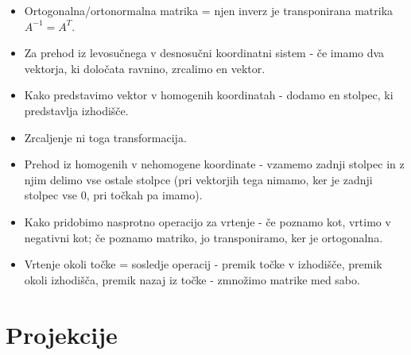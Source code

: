 \documentclass{article}
\begin{document}
\begin{itemize}
    \item Ortogonalna/ortonormalna matrika = njen inverz je transponirana matrika $A^{-1} = A^T$.
    \item Za prehod iz levosučnega v desnosučni koordinatni sistem - če imamo dva vektorja, ki določata ravnino, zrcalimo en vektor. 
    \item Kako predstavimo vektor v homogenih koordinatah - dodamo en stolpec, ki predstavlja izhodišče.
    \item Zrcaljenje ni toga transformacija.
    \item Prehod iz homogenih v nehomogene koordinate - vzamemo zadnji stolpec in z njim delimo vse ostale stolpce (pri vektorjih tega nimamo, ker je zadnji stolpec vse 0, pri točkah pa imamo).
    \item Kako pridobimo nasprotno operacijo za vrtenje - če poznamo kot, vrtimo v negativni kot; če poznamo matriko, jo transponiramo, ker je ortogonalna.
    \item Vrtenje okoli točke = sosledje operacij - premik točke v izhodišče, premik okoli izhodišča, premik nazaj iz točke - zmnožimo matrike med sabo.
\end{itemize}

\section{Projekcije}
\end{document}
